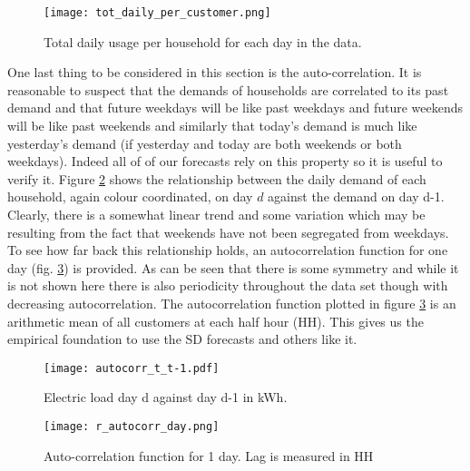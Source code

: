 \begin{figure}
\centering
\texttt{[image: tot\_daily\_per\_customer.png]}
\caption{Total daily usage per household for each day in the data.}
\label{fig:totes}
\end{figure}

One last thing to be considered in this section is the auto-correlation. It is reasonable to suspect that the demands of households are correlated to its past demand and that future weekdays will be like past weekdays and future weekends will be like past weekends and similarly that today's demand is much like yesterday's demand (if yesterday and today are both weekends or both weekdays). Indeed all of of our forecasts rely on this property so it is useful to verify it.  Figure \ref{fig:ty_colour} shows the relationship between the daily demand of each household, again colour coordinated, on day $d$ against the demand on day d-1. Clearly, there is a somewhat linear trend and some variation which may be resulting from the fact that weekends have not been segregated from weekdays. To see how far back this relationship holds, an autocorrelation function for one day (fig. \ref{fig:acf_day}) is provided. As can be seen that there is some symmetry and while it is not shown here there is also periodicity throughout the data set though with decreasing autocorrelation. The autocorrelation function plotted in figure \ref{fig:acf_day} is an arithmetic mean of all customers at each half hour (HH). This gives us the empirical foundation to use the SD forecasts and others like it.

\begin{figure}
\centering
\texttt{[image: autocorr\_t\_t-1.pdf]}
\caption{Electric load day d against day d-1 in kWh.}
\label{fig:ty_colour} 
\end{figure}

\begin{figure}
\centering
\texttt{[image: r\_autocorr\_day.png]}
\caption{Auto-correlation function for 1 day. Lag is measured in HH}
\label{fig:acf_day} 
\end{figure}




